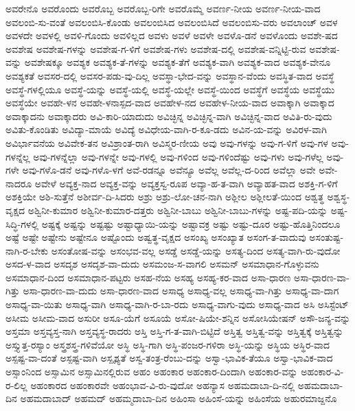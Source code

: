 {ಅವರೇನೊ
ಅವರೊಂದು
ಅವರೊಬ್ಬ
ಅವರೊಬ್ಬ-ರಿಗೇ
ಅವರೊಮ್ಮೆ
ಅವರ್ಣ-ನೀಯ
ಅವರ್ಣ-ನೀಯ-ವಾದ
ಅವಲಂಬಿ-ಸು-ವಂತೆ
ಅವಲಂಬಿಸಿ-ಕೊಂಡು
ಅವಲಂಬಿಸಿದ
ಅವಲಂಬಿಸಿದೆ
ಅವಲಂಬಿಸು-ವರು
ಅವಲಾಂಚ್
ಅವಳ
ಅವಳದೇ
ಅವಳಲ್ಲಿ
ಅವಳಿ-ಗೊಂದು
ಅವಳಿಲ್ಲದ
ಅವಳು
ಅವಳೆ
ಅವಳೇ
ಅವಳೊ-ಡನೆ
ಅವಳೊಂದು
ಅವಶೇ-ಷದ
ಅವಶೇಷ
ಅವಶೇಷ-ಗಳನ್ನು
ಅವಶೇಷ-ಗ-ಳಿಗೆ
ಅವಶೇಷ-ಗಳು
ಅವಶೇಷ-ದಲ್ಲಿ
ಅವಶೇಷ-ವನ್ನಿಟ್ಟಿ-ರುವ
ಅವಶೇಷ-ವನ್ನು
ಅವಶೇಷಕ್ಕೂ
ಅವಶ್ಯಕ
ಅವಶ್ಯಕ-ತೆ-ಗಳನ್ನು
ಅವಶ್ಯಕ-ತೆಗೆ
ಅವಶ್ಯಕ-ವಾಗಿ
ಅವಶ್ಯಕ-ವಾದ
ಅವಶ್ಯಕ-ವೇನೂ
ಅವಶ್ಯಕತೆ
ಅವಸರ-ದಲ್ಲಿ
ಅವಸರ-ಪಡು-ವು-ದಿಲ್ಲ
ಅವಸ್ಥಾ-ಭೇದ-ವನ್ನು
ಅವಸ್ಥಾನ-ವೆಂದು
ಅವಸ್ಥಿತ-ವಾದ
ಅವಸ್ಥೆ
ಅವಸ್ಥೆ-ಗಳಲ್ಲಿಯೂ
ಅವಸ್ಥೆ-ಯನ್ನು
ಅವಸ್ಥೆ-ಯಲ್ಲಿ
ಅವಸ್ಥೆ-ಯಲ್ಲೇ
ಅವಸ್ಥೆ-ಯಿಂದ
ಅವಸ್ಥೆಗೆ
ಅವಸ್ಥೆಯ
ಅವಸ್ಥೆಯು
ಅವಸ್ಥೆಯೇ
ಅವಹೇ-ಳನ
ಅವಹೇ-ಳನಾಸ್ಪದ-ವಾದ
ಅವಹೇಳ-ನದ
ಅವಹೇಳ-ನೀಯ-ವಾದ
ಅವಾಕ್ಕಾಗಿ
ಅವಾಕ್ಕಾದ
ಅವಾಕ್ಕಾದನು
ಅವಾಕ್ಕಾದರು
ಅವಿ-ಕಾರಿ-ಯಾದುದು
ಅವಿಚ್ಛಿನ್ನ
ಅವಿಚ್ಛಿನ್ನ-ವಾಗಿ
ಅವಿಚ್ಛಿನ್ನ-ವಾದ
ಅವಿತಿ-ರು-ವುದು
ಅವಿತು-ಕೊಂಡಿತು
ಅವಿದ್ಯಾ-ಮಾಯೆ
ಅವಿದ್ಯೆ
ಅವಿಧೇಯ-ವಾಗಿ-ರ-ಕೂ-ಡದು
ಅವಿನ-ಯ-ವನ್ನು
ಅವಿರಳ-ವಾಗಿ
ಅವಿರ್ಭಾವನೆಯ
ಅವಿವೇಕ-ತನ
ಅವಿಶ್ರಾಂತ-ರಾಗಿ
ಅವಿಸ್ಮರ-ಣೀಯ
ಅವು
ಅವು-ಗಳನ್ನು
ಅವು-ಗ-ಳಿಗೆ
ಅವು-ಗಳ
ಅವು-ಗಳನ್ನೆಲ್ಲ
ಅವು-ಗಳನ್ನೆಲ್ಲಾ
ಅವು-ಗಳನ್ನೇ
ಅವು-ಗಳಲ್ಲಿ
ಅವು-ಗಳಿಂದ
ಅವು-ಗಳಿಂದೆಷ್ಟು
ಅವು-ಗಳು
ಅವು-ಗಳೆಲ್ಲ
ಅವು-ಗಳೇ
ಅವು-ಗಳೊ-ಡನೆ
ಅವು-ಗಳೊ-ಳಗೆ
ಅವೆ-ರಡನ್ನೂ
ಅವೆನ್ಯೂ
ಅವೆಲ್ಲ
ಅವೆಲ್ಲ-ದ-ರಿಂದ
ಅವೆಲ್ಲಾ
ಅವೇ
ಅವೇ-ನಾದರೂ
ಅವೇಳೆ
ಅವ್ಯಕ್ತ-ನಾದ
ಅವ್ಯಕ್ತ-ವನ್ನು
ಅವ್ಯಕ್ತಸ್ವ-ರೂಪ
ಅವ್ಯಾ-ಹ-ತ-ವಾಗಿ
ಅವ್ಯಾಹತ-ವಾದ
ಅಶಕ್ತಿ-ಗ-ಳಿಗೆ
ಅಶಕ್ತಿಯೇ
ಅಶಿ-ಸುತ್ತೆನೆ
ಅಶೀರ್ವ-ದಿ-ಸಿದರು
ಅಶ್ರು
ಅಶ್ರು-ಲೋ-ಚನ-ನಾಗಿ
ಅಶ್ಲೀಲ
ಅಶ್ಲೀಲತೆ-ಯಿಂದ
ಅಶ್ವತ್ಥ
ಅಶ್ವಸ್ಥ-ವೃಕ್ಷದ
ಅಶ್ವಿನೀ-ಕುಮಾರ
ಅಶ್ವಿನೀ-ಕುಮಾರ-ದತ್ತರು
ಅಶ್ವಿನೀ-ಬಾಬು
ಅಶ್ವಿನೀ-ಬಾಬು-ಗಳನ್ನು
ಅಷ್ಟ-ಪದಿ-ಯನ್ನು
ಅಷ್ಟ-ಸಿದ್ಧಿ-ಗಳಲ್ಲಿ
ಅಷ್ಟಕ್ಕೆ
ಅಷ್ಟನ್ನು
ಅಷ್ಟಷ್ಟು
ಅಷ್ಟಾಧ್ಯಾಯಿ-ಯನ್ನು
ಅಷ್ಟಾವಕ್ರ
ಅಷ್ಟು
ಅಷ್ಟು-ದೂರ
ಅಷ್ಟು-ಹೊತ್ತಿನಿಂದಲೂ
ಅಷ್ಟೆ
ಅಷ್ಟೇ
ಅಷ್ಟೇನು
ಅಷ್ಟೇನೂ
ಅಷ್ಟೊಂದು
ಅಷ್ವತ್ಥ-ವೃಕ್ಷದ
ಅಸಂಖ್ಯ
ಅಸಂಖ್ಯಾತ
ಅಸಂಗ-ತ-ವಾದುವು
ಅಸಂತುಷ್ಟ-ನಾಗಿ-ರ-ಬೇಕು
ಅಸಂತೋಷ-ವನ್ನು
ಅಸಂಭವ-ವಲ್ಲ
ಅಸಡ್ಡೆ
ಅಸಡ್ಡೆ-ಯನ್ನು
ಅಸತ್ಯ-ದಿಂದ
ಅಸತ್ಯ-ವಾಗಿ-ರು-ವುದೋ
ಅಸದ-ಳ-ವಾದ
ಅಸದೃಶ
ಅಸದೃಶ-ವಾ-ದುದು
ಅಸಮಂಜ-ಸ-ವಾಗಲಿ
ಅಸಮನ್
ಅಸಮಾಧಾನ-ಗೊಳ್ಳುವನು
ಅಸಮಾಧಾನ-ದಿಂದ
ಅಸಮಾಧಾನ-ಪಟ್ಟರು
ಅಸಹ-ನೆಯ
ಅಸಹ್ಯ
ಅಸಹ್ಯ-ಕರ-ವಾದ
ಅಸಾ-ಧಾರಣ
ಅಸಾ-ಧಾರಣ-ವಾ-ಗಿತ್ತು
ಅಸಾ-ಧಾರಣ-ವಾ-ದುದು
ಅಸಾ-ಧಾರಣ-ವಾದ
ಅಸಾಧ್ಯ
ಅಸಾಧ್ಯ-ವಲ್ಲ
ಅಸಾಧ್ಯ-ವಾ-ಗಿತ್ತು
ಅಸಾಧ್ಯ-ವಾ-ದಾಗ
ಅಸಾಧ್ಯ-ವಾ-ಯಿತು
ಅಸಾಧ್ಯ-ವಾಗಿ
ಅಸಾಧ್ಯ-ವಾಗಿ-ರ-ಬಾ-ರದು
ಅಸಾಧ್ಯ-ವಾಗು-ವುದು
ಅಸಾಧ್ಯ-ವಾದ
ಅಸಿ
ಅಸಿಸ್ಟೆಂಟ್
ಅಸೀಮ
ಅಸೀಮ-ವಾದ
ಅಸುರೀ
ಅಸೂ-ಯೆಗೆ
ಅಸೂಯೆ
ಅಸೋ-ಷಿಯೇ-ಶನ್ನಿನ
ಅಸೋಸಿಯೇಷನ್
ಅಸೌ-ಜನ್ಯ-ವನ್ನು
ಅಸ್ತಮಾ
ಅಸ್ತವ್ಯಸ್ತ-ನಾಗಿ
ಅಸ್ತವ್ಯಸ್ಥ-ರಾದರು
ಅಸ್ತಿ
ಅಸ್ತಿ-ಗ-ತ-ವಾಗಿ-ಬಿಟ್ಟಿದೆ
ಅಸ್ತಿತ್ವ
ಅಸ್ತಿತ್ವ-ವನ್ನು
ಅಸ್ತಿತ್ವಕ್ಕೆ
ಅಸ್ತಿತ್ವನ್ನು
ಅಸ್ತ್ಯುತ್ತ-ರಸ್ಯಾಂ
ಅಸ್ತ್ರಶಸ್ತ್ರ-ಗಳಿವೆಯೋ
ಅಸ್ಥಿ
ಅಸ್ಥಿ-ಗಾಗಿ
ಅಸ್ಥಿ-ಪಂಜರ-ಗಳಿರಾ
ಅಸ್ಥಿ-ಯನ್ನು
ಅಸ್ಥಿಯ
ಅಸ್ಥಿರ-ವಾದ
ಅಸ್ಪಷ್ಟ-ವಾ-ದಂತೆ
ಅಸ್ಪಷ್ಟ-ವಾಗಿ
ಅಸ್ಪೃಶ್ಯತೆ
ಅಸ್ವ-ತಂತ್ರ-ರೆಂಬು-ದನ್ನು
ಅಸ್ವಾ-ಭಾವಿಕ-ತೆಯೂ
ಅಸ್ವಾ-ಭಾವಿಕ-ವಾದ
ಅಸ್ಸಾಂನಿಂದ
ಅಸ್ಸಾಮಿನ
ಅಸ್ಸಾಮಿನಲ್ಲಿರುವ
ಅಹಂ
ಅಹಂಕಾರ
ಅಹಂಕಾರ-ದಿಂದಾಗಿ
ಅಹಂಕಾರ-ವನ್ನು
ಅಹಂಕಾರ-ವಿ-ರ-ಲಿಲ್ಲ
ಅಹಂಕಾರದ
ಅಹಂಕಾರವೇ
ಅಹಂಭಾವ-ವಿ-ರು-ವುದೋ
ಅಹನ್ಯಾಸ
ಅಹಮದಾಬಾ-ದಿ-ನಲ್ಲಿ
ಅಹಮದಾಬಾ-ದಿನ
ಅಹಮದಾಬಾದ್
ಅಹಮದ್
ಅಹಮ್ಮದಾಬಾ-ದಿನ
ಅಹಿಂಸಾ
ಅಹಿಂಸೆ-ಯನ್ನು
ಅಹಿಂಸೆಯ
ಅಹುರಮಾಜ್ದನೊ
}
